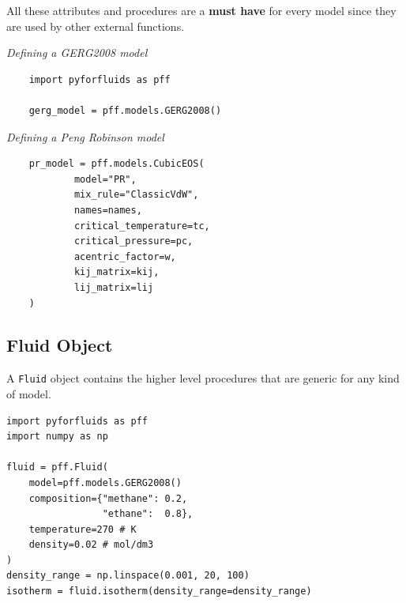 \documentclass[a0,portrait]{a0poster}
\begin{document}
\begin{multicols}{2}

All these attributes and procedures are a \textbf{must have} for every model
since they are used by other external functions.

\begin{multicols}{2}

\emph{Defining a GERG2008 model}
\begin{verbatim}
    import pyforfluids as pff

    gerg_model = pff.models.GERG2008()
\end{verbatim}
\vfill\null
\columnbreak

\emph{Defining a Peng Robinson model}
\begin{verbatim}
    pr_model = pff.models.CubicEOS(
            model="PR",
            mix_rule="ClassicVdW",
            names=names,
            critical_temperature=tc,
            critical_pressure=pc,
            acentric_factor=w,
            kij_matrix=kij,
            lij_matrix=lij
    )
\end{verbatim}
\end{multicols}

\vspace{5cm}

\subsection*{Fluid Object}
A \texttt{Fluid} object contains the higher level procedures that are generic
for any kind of model.


\begin{multicols}{2}
\begin{verbatim}
import pyforfluids as pff
import numpy as np

fluid = pff.Fluid(
    model=pff.models.GERG2008()
    composition={"methane": 0.2,
                 "ethane":  0.8},
    temperature=270 # K
    density=0.02 # mol/dm3
)
density_range = np.linspace(0.001, 20, 100)
isotherm = fluid.isotherm(density_range=density_range)
\end{verbatim}


\end{multicols}
\end{multicols}
\end{document}
